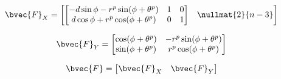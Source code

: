 \begin{equation}
  \bvec{F}_X = 
    \begin{bmatrix}
      \begin{bmatrix}
          -d \sin{\phi} - r^p \sin(\phi + \theta^p)  & 1 & 0\\
          d\cos{\phi} + r^p\cos(\phi + \theta^p) & 0 & 1
      \end{bmatrix} & \nullmat{2}{n-3} \end{bmatrix}
  \label{eq:inverse-measurement-model-jacobian-state-part}
\end{equation}

\begin{equation}
  \bvec{F}_Y = \begin{bmatrix}
       \cos(\phi + \theta^p) & -r^p\sin(\phi + \theta^p)\\
       \sin(\phi + \theta^p) & r^p\cos(\phi + \theta^p)
    \end{bmatrix}   
  \label{eq:inverse-measurement-model-jacobian-measurement-part}
\end{equation}

\begin{equation}
  \bvec{F} = \begin{bmatrix}
    \bvec{F}_X & \bvec{F}_Y
  \end{bmatrix}
  \label{eq:inverse-measurement-model-jacobian-full}
\end{equation}


